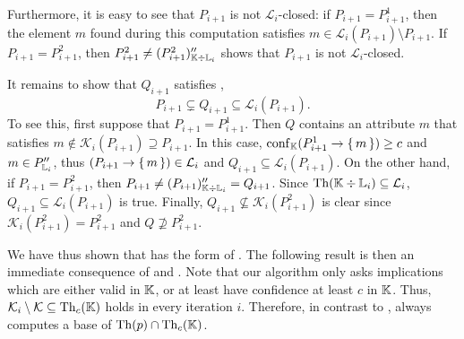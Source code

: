 Furthermore, it is easy to see that $P_{i+1}$ is not $\mathcal{L}_{i}$-closed: if $P_{i+1}
= P_{i+1}^{1}$, then the element $m$ found during this computation satisfies $m \in
\mathcal{L}_{i}(P_{i+1}) \setminus P_{i+1}$.  If $P_{i+1} = P_{i+1}^{2}$, then
$P_{i+1}^{2} \neq (P_{i+1}^{2})_{{\mathbb{K}} \div {\ensuremath{\mathbb{L}}}_{i}}''$ shows that $P_{i+1}$ is not
$\mathcal{L}_{i}$-closed.

It remains to show that $Q_{i+1}$ satisfies , \ie
\begin{equation*}
  P_{i+1} \subsetneq Q_{i+1} \subseteq \mathcal{L}_{i}(P_{i+1}).
\end{equation*}
To see this, first suppose that $P_{i+1} = P_{i+1}^{1}$.  Then $Q$ contains an attribute
$m$ that satisfies $m \notin \mathcal{K}_{i}(P_{i+1}) \supseteq P_{i+1}$.  In this case,
$\operatorname{conf}_{{\mathbb{K}}}(P_{i+1}^{1} \to {\ensuremath{\{\,m\,\}}}) \ge c$ and $m \in P_{{\mathbb{L}}_{i}}''$, thus
$(P_{i+1} \to {\ensuremath{\{\,m\,\}}}) \in \mathcal{L}_{i}$ and $Q_{i+1} \subseteq
\mathcal{L}_{i}(P_{i+1})$.  On the other hand, if $P_{i+1} = P_{i+1}^{2}$, then $P_{i+1}
\neq (P_{i+1})_{{\mathbb{K}} \div {\ensuremath{\mathbb{L}}}_{i}}'' = Q_{i+1}$.  Since $\operatorname{Th}({\mathbb{K}} \div {\ensuremath{\mathbb{L}}}_{i})
\subseteq \mathcal{L}_{i}$, $Q_{i+1} \subseteq \mathcal{L}_{i}(P_{i+1})$ is true.
Finally, $Q_{i+1} \not\subseteq \mathcal{K}_{i}(P_{i+1}^{2})$ is clear since
$\mathcal{K}_{i}(P_{i+1}^{2}) = P_{i+1}^{2}$ and $Q \not\supseteq P_{i+1}^{2}$.

We have thus shown that  has
the form of .  The following result is then
an immediate consequence of  and
.  Note that our
algorithm only asks implications which are either valid in ${\mathbb{K}}$, or at least have
confidence at least $c$ in ${\mathbb{K}}$.  Thus, $\mathcal{K}_{i} \setminus \mathcal{K}
\subseteq \operatorname{Th}_{c}({\mathbb{K}})$ holds in every iteration $i$.  Therefore, in contrast to
,
 always computes a base of
$\operatorname{Th}(p) \cap \operatorname{Th}_{c}({\mathbb{K}})$.

